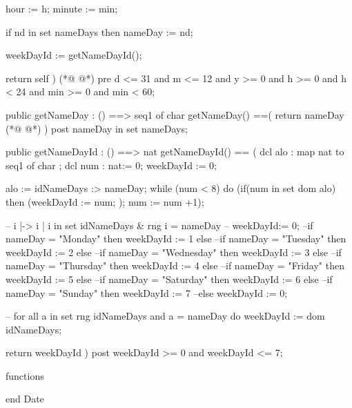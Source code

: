 \begin{vdmpp}[breaklines=true]
    hour := h;
    minute := min;

    if nd in set nameDays
    then nameDay := nd;
    
    weekDayId := getNameDayId();
      
    return self
  )
(*@
\label{getNameDay:82}
@*)
  pre d <= 31 and m <= 12 and y >= 0 and h >= 0 and h < 24 and min >= 0 and min < 60;


  public getNameDay : () ==>  seq1 of char
   getNameDay() ==( 
   return nameDay
(*@
\label{getNameDayId:88}
@*)
   )
   post nameDay in set nameDays;
  
  public getNameDayId : () ==> nat
   getNameDayId() == (
   dcl alo : map nat to seq1 of char ;
   dcl num : nat:= 0;
   weekDayId := 0;
   
   alo := idNameDays :> {nameDay};
   while (num < 8) do
    (if(num in set dom alo)
     then (weekDayId := num;
        );
     num := num +1);
    
   
 --  {i |-> i | i in set idNameDays & rng i = nameDay }
  -- weekDayId:= 0;
   --if nameDay = "Monday" then weekDayId := 1 else 
    --if nameDay = "Tuesday" then weekDayId := 2 else 
     --if nameDay = "Wednesday" then weekDayId := 3 else 
      --if nameDay = "Thursday" then weekDayId := 4 else 
       --if nameDay = "Friday" then weekDayId := 5 else 
        --if nameDay = "Saturday" then weekDayId := 6 else 
         --if nameDay = "Sunday" then weekDayId := 7
         --else weekDayId := 0;
         
  -- for all a in set rng idNameDays and a = nameDay do weekDayId := dom idNameDays;

   return weekDayId
   )
   post weekDayId >= 0 and weekDayId <= 7;  
   

functions

end Date
\end{vdmpp}
